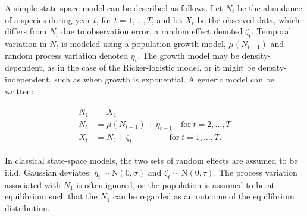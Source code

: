 \documentclass[12pt,english]{article}
\begin{document}
\begin{spacing}{1.9}
\begin{flushleft}
A simple state-space model can be described as follows.
Let $N_t$ be the abundance of a species during year $t$, for
$t=1,\hdots,T$, and let $X_t$ be
the observed data, which differs from $N_t$ due to observation error,
a random effect denoted $\zeta_t$. Temporal variation in $N_t$ is
modeled using a population growth model, $\mu(N_{t-1})$
and random process variation denoted $\eta_t$.
The growth model may be density-dependent, as in the case of the 
Ricker-logistic model, or it might be density-independent, such as when growth
is exponential.
A generic model can be written: %
\begin{linenomath*}
\begin{gather}
  \label{eq:ss1}
  \begin{align}
    N_1 &= X_1 \nonumber \\
N_t &= \mu(N_{t-1}) + \eta_{t-1} \quad \text{for} \;
t=2,\hdots,T  \\
X_t &= N_t + \zeta_t \qquad \qquad \;\, \text{for} \;
t=1,\hdots,T. \nonumber 
  \end{align}
\end{gather}
\end{linenomath*}
In classical
state-space models, the two sets of random effects
are assumed to be i.i.d. Gaussian deviates:
$\eta_t \sim \mathrm{N}(0, \sigma)$ and
$\zeta_t \sim \mathrm{N}(0, \tau)$. %
The process variation associated with $N_1$ is often ignored, or
the population is assumed to be at equilibrium such that the $N_1$ can
be regarded as an outcome of the equilibrium distribution.


\end{flushleft}
\end{spacing}
\end{document}
